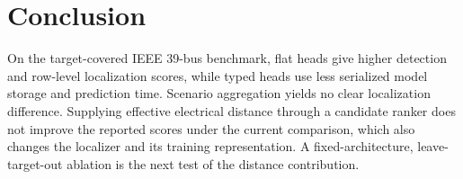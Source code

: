 \documentclass[conference]{IEEEtran}
\begin{document}
\FloatBarrier
\section{Conclusion}
On the target-covered IEEE 39-bus benchmark, flat heads give higher detection and row-level localization scores, while typed heads use less serialized model storage and prediction time. Scenario aggregation yields no clear localization difference. Supplying effective electrical distance through a candidate ranker does not improve the reported scores under the current comparison, which also changes the localizer and its training representation. A fixed-architecture, leave-target-out ablation is the next test of the distance contribution.



\end{document}
